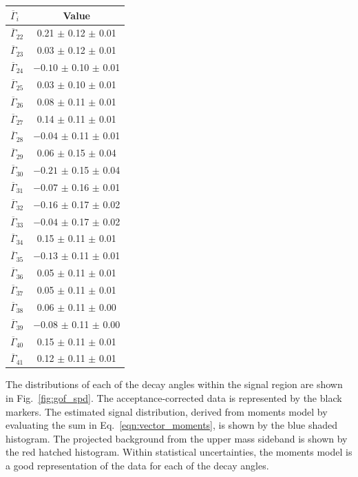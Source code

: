 \begin{table}[!tb]
\hspace{1em}
\begin{tabular}{l|c}
$\overline{\Gamma}_{i}$ & Value \\ 
\hline
$\overline{\Gamma}_{22}$ & \hphantom{$-$}0.21 $\pm$ 0.12 $\pm$ 0.01 \\ 
$\overline{\Gamma}_{23}$ & \hphantom{$-$}0.03 $\pm$ 0.12 $\pm$ 0.01 \\ 
$\overline{\Gamma}_{24}$ & $-0.10$ $\pm$ 0.10 $\pm$ 0.01 \\ 
$\overline{\Gamma}_{25}$ & \hphantom{$-$}0.03 $\pm$ 0.10 $\pm$ 0.01 \\ 
$\overline{\Gamma}_{26}$ & \hphantom{$-$}0.08 $\pm$ 0.11 $\pm$ 0.01 \\ 
$\overline{\Gamma}_{27}$ & \hphantom{$-$}0.14 $\pm$ 0.11 $\pm$ 0.01 \\ 
$\overline{\Gamma}_{28}$ & $-0.04$ $\pm$ 0.11 $\pm$ 0.01 \\ 
$\overline{\Gamma}_{29}$ & \hphantom{$-$}0.06 $\pm$ 0.15 $\pm$ 0.04 \\ 
$\overline{\Gamma}_{30}$ & $-0.21$ $\pm$ 0.15 $\pm$ 0.04 \\ 
$\overline{\Gamma}_{31}$ & $-0.07$ $\pm$ 0.16 $\pm$ 0.01 \\ 
$\overline{\Gamma}_{32}$ & $-0.16$ $\pm$ 0.17 $\pm$ 0.02 \\ 
$\overline{\Gamma}_{33}$ & $-0.04$ $\pm$ 0.17 $\pm$ 0.02 \\ 
$\overline{\Gamma}_{34}$ & \hphantom{$-$}0.15 $\pm$ 0.11 $\pm$ 0.01 \\ 
$\overline{\Gamma}_{35}$ & $-0.13$ $\pm$ 0.11 $\pm$ 0.01 \\ 
$\overline{\Gamma}_{36}$ & \hphantom{$-$}0.05 $\pm$ 0.11 $\pm$ 0.01 \\ 
$\overline{\Gamma}_{37}$ & \hphantom{$-$}0.05 $\pm$ 0.11 $\pm$ 0.01 \\ 
$\overline{\Gamma}_{38}$ & \hphantom{$-$}0.06 $\pm$ 0.11 $\pm$ 0.00 \\ 
$\overline{\Gamma}_{39}$ & $-0.08$ $\pm$ 0.11 $\pm$ 0.00 \\ 
$\overline{\Gamma}_{40}$ & \hphantom{$-$}0.15 $\pm$ 0.11 $\pm$ 0.01 \\ 
$\overline{\Gamma}_{41}$ & \hphantom{$-$}0.12 $\pm$ 0.11 $\pm$ 0.01 \\ 
\end{tabular}
\end{table}


The distributions of each of the decay angles within the signal region are shown in Fig.~\ref{fig:gof_spd}. The acceptance-corrected data is represented by the black markers. The estimated signal distribution, derived from moments model by evaluating the sum in Eq.~\ref{eqn:vector_moments}, is shown by the blue shaded histogram. The projected background from the upper mass sideband is shown by the red hatched histogram. Within statistical uncertainties, the moments model is a good representation of the data for each of the decay angles.

